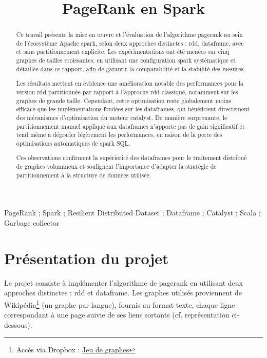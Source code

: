 \documentclass[conference]{IEEEtran}
\title{\LARGE \bf PageRank en Spark}
\author{\IEEEauthorblockN{Aurélien Duvignac-Rosa, Jean-Marc Fauvel, Edoardo Piciucchi}}
\begin{document}
\maketitle
\thispagestyle{fancy}

\begin{abstract}
Ce travail présente la mise en œuvre et l'évaluation de l'algorithme \gls{pagerank} au sein de l'écosystème Apache \gls{spark}, selon deux approches distinctes : \gls{rdd}, \gls{dataframe}, avec et sans partitionnement explicite.
Les expérimentations ont été menées sur cinq graphes de tailles croissantes, en utilisant une configuration \gls{spark} systématique et détaillée dans ce rapport, afin de garantir la comparabilité et la stabilité des mesures.  

Les résultats mettent en évidence une amélioration notable des performances pour la version \gls{rdd} partitionnée par rapport à l'approche \gls{rdd} classique, notamment sur les graphes de grande taille.  
Cependant, cette optimisation reste globalement moins efficace que les implémentations fondées sur les \glspl{dataframe}, qui bénéficient directement des mécanismes d'optimisation du moteur \gls{catalyst}.  
De manière surprenante, le partitionnement manuel appliqué aux \glspl{dataframe} n'apporte pas de gain significatif et tend même à dégrader légèrement les performances, en raison de la perte des optimisations automatiques de \gls{spark} SQL.  

Ces observations confirment la supériorité des \glspl{dataframe} pour le traitement distribué de graphes volumineux et soulignent l'importance d'adapter la stratégie de partitionnement à la structure de données utilisée.
\end{abstract}

\begin{IEEEkeywords}
PageRank ; Spark ; Resilient Distributed Dataset ; Dataframe ; Catalyst ; Scala ; Garbage collector
\end{IEEEkeywords}

\section{Présentation du projet}

Le projet consiste à implémenter l'algorithme de \gls{pagerank} en utilisant deux approches distinctes : \gls{rdd} et \gls{dataframe}.
Les graphes utilisés proviennent de Wikipédia\footnote{Accès via Dropbox : \href{https://www.dropbox.com/sh/serapy4ro02phu5/AAASs2Wb2WuwfNoX1FNwwqBDa}{Jeu de graphes}} (un graphe par langue), fournis au format texte, chaque ligne correspondant à une page suivie de ses liens sortants (cf. représentation ci-dessous).  
\end{document}
